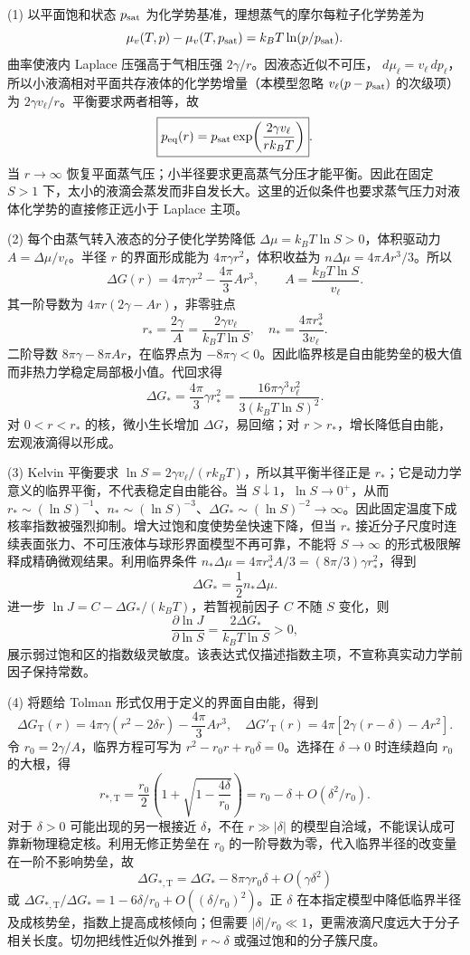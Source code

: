(1) 以平面饱和状态 \(p_{\rm sat}\) 为化学势基准，理想蒸气的摩尔每粒子化学势差为
\[
\mu_v(T,p)-\mu_v(T,p_{\rm sat})=k_BT\ln(p/p_{\rm sat}).
\]
曲率使液内 Laplace 压强高于气相压强 \(2\gamma/r\)。因液态近似不可压，
\(d\mu_\ell=v_\ell\,dp_\ell\)，所以小液滴相对平面共存液体的化学势增量（本模型忽略 \(v_\ell(p-p_{\rm sat})\) 的次级项）为 \(2\gamma v_\ell/r\)。平衡要求两者相等，故
\[
\boxed{p_{\rm eq}(r)=p_{\rm sat}\exp\!\left(\frac{2\gamma v_\ell}{r k_BT}\right)}.
\]
当 \(r\to\infty\) 恢复平面蒸气压；小半径要求更高蒸气分压才能平衡。因此在固定 \(S>1\) 下，太小的液滴会蒸发而非自发长大。这里的近似条件也要求蒸气压力对液体化学势的直接修正远小于 Laplace 主项。

(2) 每个由蒸气转入液态的分子使化学势降低
\(\Delta\mu=k_BT\ln S>0\)，体积驱动力 \(A=\Delta\mu/v_\ell\)。半径 \(r\) 的界面形成能为 \(4\pi\gamma r^2\)，体积收益为 \(n\Delta\mu=4\pi Ar^3/3\)。所以
\[
\boxed{\Delta G(r)=4\pi\gamma r^2-\frac{4\pi}{3}Ar^3},
\qquad A=\frac{k_BT\ln S}{v_\ell}.
\]
其一阶导数为 \(4\pi r(2\gamma-Ar)\)，非零驻点
\[
\boxed{r_*=\frac{2\gamma}{A}
=\frac{2\gamma v_\ell}{k_BT\ln S}},\quad
\boxed{n_*=\frac{4\pi r_*^3}{3v_\ell}}.
\]
二阶导数 \(8\pi\gamma-8\pi Ar\)，在临界点为 \(-8\pi\gamma<0\)。因此临界核是自由能势垒的极大值而非热力学稳定局部极小值。代回求得
\[
\boxed{\Delta G_*=\frac{4\pi}{3}\gamma r_*^2
=\frac{16\pi\gamma^3v_\ell^2}{3(k_BT\ln S)^2}}.
\]
对 \(0<r<r_*\) 的核，微小生长增加 \(\Delta G\)，易回缩；对 \(r>r_*\)，增长降低自由能，宏观液滴得以形成。

(3) Kelvin 平衡要求 \(\ln S=2\gamma v_\ell/(rk_BT)\)，所以其平衡半径正是 \(r_*\)；它是动力学意义的临界平衡，不代表稳定自由能谷。当 \(S\downarrow1\)，\(\ln S\to0^+\)，从而 \(r_*\sim(\ln S)^{-1}\)、\(n_*\sim(\ln S)^{-3}\)、\(\Delta G_*\sim(\ln S)^{-2}\to\infty\)。因此固定温度下成核率指数被强烈抑制。增大过饱和度使势垒快速下降，但当 \(r_*\) 接近分子尺度时连续表面张力、不可压液体与球形界面模型不再可靠，不能将 \(S\to\infty\) 的形式极限解释成精确微观结果。利用临界条件 \(n_*\Delta\mu=4\pi r_*^3A/3=(8\pi/3)\gamma r_*^2\)，得到
\[
\boxed{\Delta G_*=\frac12 n_*\Delta\mu}.
\]
进一步 \(\ln J=C-\Delta G_*/(k_BT)\)，若暂视前因子 \(C\) 不随 \(S\) 变化，则
\[
\frac{\partial\ln J}{\partial\ln S}
=\frac{2\Delta G_*}{k_BT\ln S}>0,
\]
展示弱过饱和区的指数级灵敏度。该表达式仅描述指数主项，不宣称真实动力学前因子保持常数。

(4) 将题给 Tolman 形式仅用于定义的界面自由能，得到
\[
\Delta G_{\mathrm T}(r)=4\pi\gamma(r^2-2\delta r)-\frac{4\pi}{3}Ar^3,\quad
\Delta G'_{\mathrm T}(r)=4\pi[2\gamma(r-\delta)-Ar^2].
\]
令 \(r_0=2\gamma/A\)，临界方程可写为
\(r^2-r_0r+r_0\delta=0\)。选择在 \(\delta\to0\) 时连续趋向 \(r_0\) 的大根，得
\[
r_{*,\mathrm T}=\frac{r_0}{2}\left(1+\sqrt{1-\frac{4\delta}{r_0}}\right)
=\boxed{r_0-\delta+O(\delta^2/r_0)}.
\]
对于 \(\delta>0\) 可能出现的另一根接近 \(\delta\)，不在 \(r\gg|\delta|\) 的模型自洽域，不能误认成可靠新物理稳定核。利用无修正势垒在 \(r_0\) 的一阶导数为零，代入临界半径的改变量在一阶不影响势垒，故
\[
\boxed{\Delta G_{*,\mathrm T}
=\Delta G_*-8\pi\gamma r_0\delta+O(\gamma\delta^2)}
\]
或 \(\Delta G_{*,\mathrm T}/\Delta G_*=1-6\delta/r_0+O((\delta/r_0)^2)\)。正 \(\delta\) 在本指定模型中降低临界半径及成核势垒，指数上提高成核倾向；但需要 \(|\delta|/r_0\ll1\)，更需液滴尺度远大于分子相关长度。切勿把线性近似外推到 \(r\sim\delta\) 或强过饱和的分子簇尺度。